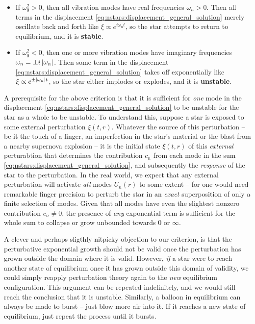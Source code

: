\begin{itemize}
\item If $\omega_0^2 > 0$, then all vibration modes have real frequencies $\omega_n > 0$.
      Then all terms in the displacement \eqref{eq:nstars:displacement_general_solution} merely oscillate back and forth like $\xi \propto e^{i \omega_n t}$, so the star attempts to return to equilibrium, and it is \textbf{stable}.
\item If $\omega_0^2 < 0$, then one or more vibration modes have imaginary frequencies $\omega_n = \pm i \left\lvert \omega_n \right\rvert$.
      Then some term in the displacement \eqref{eq:nstars:displacement_general_solution} takes off exponentially like $\xi \propto e^{\pm \left\lvert \omega_n \right\rvert t}$, so the star either implodes or explodes, and it is \textbf{unstable}.
\end{itemize}
A prerequisite for the above criterion is that it is sufficient for \emph{one} mode in the displacement \eqref{eq:nstars:displacement_general_solution} to be unstable for the star as a whole to be unstable.
To understand this, suppose a star is exposed to some external perturbation $\xi(t,r)$.
Whatever the source of this perturbation -- be it the touch of a finger, an imperfection in the star's material or the blast from a nearby supernova explosion -- it is the initial state $\xi(t,r)$ of this \emph{external} perturabtion that determines the contribution $c_n$ from each mode in the sum \eqref{eq:nstars:displacement_general_solution}, and subsequently the \emph{response} of the star to the perturbation.
In the real world, we expect that any external perturbation will activate \emph{all} modes $U_n(r)$ to some extent -- for one would need remarkable finger precision to perturb the star in an \emph{exact} superposition of only a finite selection of modes.
Given that all modes have even the slightest nonzero contribution $c_n \neq 0$, the presence of \emph{any} exponential term is sufficient for the whole sum to collapse or grow unbounded towards $0$ or $\infty$.

A clever and perhaps sligthly nitpicky objection to our criterion, is that the perturbative exponential growth should not be valid once the perturbation has grown outside the domain where it is valid.
However, \emph{if} a star were to reach another state of equilibrium once it has grown outside this domain of validity, we could simply reapply perturbation theory again to the \emph{new} equilibrium configuration.
This argument can be repeated indefinitely, and we would still reach the conclusion that it is unstable.
Similarly, a balloon in equilibrium can always be made to burst -- just blow more air into it.
If it reaches a new state of equilibrium, just repeat the process until it bursts.

